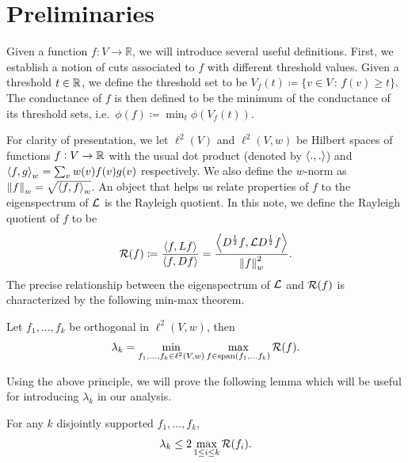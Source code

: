 \documentclass[11pt]{article}
\begin{document}
\section{Preliminaries}
Given a function $f: V \to \mathbb{R}$, we will introduce several useful definitions. First, we establish a notion of cuts associated to $f$ with different threshold values. Given a threshold $t \in \mathbb R$, we define the threshold set to be  $V_f(t) \coloneqq \{ v \in V \, : \, f(v) \geq t\}$. The conductance of $f$ is then defined to be the minimum of the conductance of its threshold sets, i.e.\ $\phi(f) \coloneqq \min_{t} \phi(V_f(t))$.

For clarity of presentation, we let $\ell^2(V)$ and $\ell^2(V,w)$ be Hilbert spaces of functions $f : V \to \mathbb R$ with the usual dot product (denoted by $\left\langle{.},{.}\right\rangle$) and $\left\langle{f},{g}\right\rangle_w = \sum_{v}w(v)f(v)g(v)$ respectively. We also define the $w$-norm as $\left\lVert f \right\rVert_w = \sqrt{\left\langle{f},{f}\right\rangle_w}$. An object that helps us relate properties of $f$ to the eigenspectrum of $\mathcal{L}$ is the Rayleigh quotient. In this note, we define the Rayleigh quotient of $f$ to be
\begin{equation}
        \mathcal{R}(f) \coloneqq  \frac{\left\langle{f},{L f}\right\rangle}{\left\langle{f},{Df}\right\rangle} = \frac{\left\langle{D^{\frac{1}{2}} f},{\mathcal{L} D^{\frac{1}{2}} f}\right\rangle}{\left\lVert f \right\rVert_w^2}.
\end{equation}
The precise relationship between the eigenspectrum of $\mathcal{L}$ and $\mathcal{R}(f)$ is characterized by the following min-max theorem.
\begin{lemma}\label{lem:minmax}
Let $f_1,...,f_k$ be orthogonal in $\ell^2(V,w)$, then
\begin{equation}
    \lambda_k = \min_{f_1,...,f_k \in \ell^2(V,w)} \max_{f \in \operatorname{span}(f_1,...f_k)} \mathcal{R}(f).
\end{equation}
\end{lemma}
Using the above principle, we will prove the following lemma which will be useful for introducing $\lambda_k$ in our analysis.
\begin{lemma} \label{lem1}
    For any $k$ disjointly supported $f_1,...,f_k$,
        $$\lambda_k \leq 2\max_{1\leq i\leq k} \mathcal{R}(f_i).$$
\end{lemma}
\end{document}
